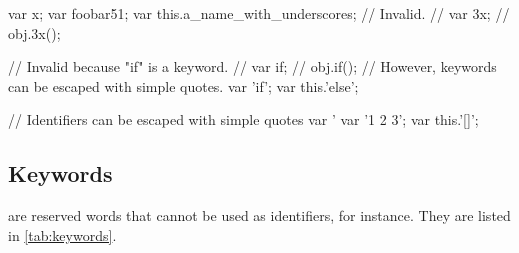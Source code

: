 \begin{urbiscript}[firstnumber=last]
var x;
var foobar51;
var this.a_name_with_underscores;
// Invalid.
// var 3x;
// obj.3x();

// Invalid because "if" is a keyword.
// var if;
// obj.if();
// However, keywords can be escaped with simple quotes.
var 'if';
var this.'else';

// Identifiers can be escaped with simple quotes
var '%
var '1 2 3';
var this.'[]';
\end{urbiscript}

\subsection{Keywords}
\label{sec:syn-key}

 are reserved words that cannot be used as identifiers,
for instance.  They are listed in \autoref{tab:keywords}.

